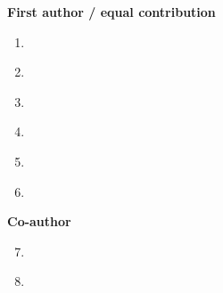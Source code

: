 


\begin{cvparagraph}
\textbf{First author / equal contribution}

\begin{enumerate}
\item {}\label{paper:midl}
\item {}\label{paper:diffusion}
\item {}\label{paper:uncertainty}
\item {}\label{paper:hopping}
\item {}\label{paper:inter}
\item {}\label{paper:quantifiable}
\end{enumerate}

\textbf{Co-author}
\begin{enumerate}
\setcounter{enumi}{6}
\item {}\label{paper:covid}
\item {}\label{paper:nature}
\end{enumerate}
\end{cvparagraph}
